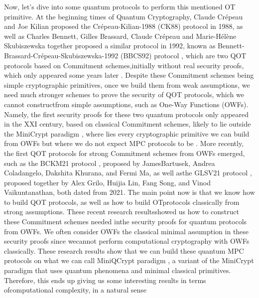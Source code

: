 \documentclass[12pt]{article}
\begin{document}
    \noindent Now, let's dive into some quantum protocols to perform this mentioned OT primitive. At the beginning times of Quantum Cryptography, Claude Cr\'{e}peau and Joe Kilian proposed the Cr\'{e}peau-Kilian-1988 (CK88) protocol\break \cite{crepeau-kilian:achieving-oblivious-transfer-using-weakened-security-assumptions:1988:03-2024,crepeau-kilian:weakening-security-assumptions-and-oblivious-transfer:1988:03-2024} in 1988, as well as Charles Bennett, Gilles Brassard, Claude Cr\'{e}peau and Marie-H\'{e}l\`{e}ne Skubiszewska together proposed a similar protocol in 1992, known as Bennett-Brassard-Cr\'{e}peau-Skubiszewska-1992 (BBCS92) protocol \cite{bennett-brassard-crepeau-skubiszewska:practical-quantum-oblivious-transfer:1992-03-2024}, which are two QOT protocols based on Commitment schemes,\break initially without real security proofs, which only appeared some years later \cite{damgard-fehr-lunemann-salvail-schaffner:improving-security-quantum-protocols-commit-and-open:2009:03-2024,bouman-fehr:sampling-quantum-population-and-applications:2012:03-2024}. Despite these Commitment schemes being simple cryptographic primitives, once we build them from weak assumptions, we need much stronger schemes to prove the security of QOT protocols, which we cannot construct\break from simple assumptions, such as One-Way Functions (OWFs). Namely, the first security proofs for these two quantum protocols only appeared in the XXI century, based on classical Commitment schemes, likely to lie outside the MiniCrypt paradigm \cite{impagliazzo:personal-view-average-case-complexity:1995:03-2024}, where lies every cryptographic primitive we can build from OWFs but where we do not expect MPC protocols to be \cite{impagliazzo-rudich:limits-provable-consequences-one-way-permutations:1990:03-2024,rudich:use-interaction-public-cryptosystems:1992:03-2024,impagliazzo:personal-view-average-case-complexity:1995:03-2024}. More recently, the first QOT protocols for strong Commitment schemes from OWFs emerged, such as the BCKM21 protocol \cite{bartusek-coladangelo-khurana-ma:one-way-functions-imply-secure-computation-quantum-world:2020:03-2024}, proposed by James\break Bartusek, Andrea Coladangelo, Dakshita Khurana, and Fermi Ma, as well as\break the GLSV21 protocol \cite{grilo-lin-song-vaikuntanathan:oblivious-transfer-miniqcrypt:2020:03-2024}, proposed together by Alex Grilo, Huijia Lin, Fang Song, and Vinod Vaikuntanathan, both dated from 2021. The main point now is that we know how to build QOT protocols, as well as how to build OT\break protocols classically from strong assumptions. These recent research results\break showed us how to construct these Commitment schemes needed in\break the security proofs for quantum protocols from OWFs. We often consider OWFs the classical minimal assumption in these security proofs since we\break cannot perform computational cryptography with OWFs classically. These research results show that we can build these quantum MPC protocols on what we can call MiniQCrypt paradigm \cite{grilo-lin-song-vaikuntanathan:oblivious-transfer-miniqcrypt:2020:03-2024}, a variant of the MiniCrypt paradigm that uses quantum phenomena and minimal classical primitives. Therefore, this ends up giving us some interesting results in terms of\break computational complexity, in a natural sense 
\end{document}
